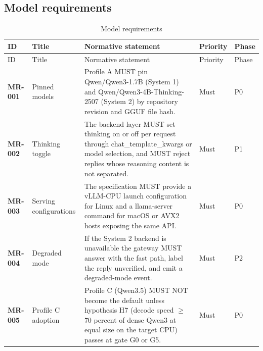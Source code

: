 \subsection{Model requirements}
\begin{longtable}{@{}p{1.45cm}p{2.5cm}p{8.1cm}p{1.6cm}p{1.1cm}@{}}
\caption{Model requirements}\\
\toprule ID & Title & Normative statement & Priority & Phase\\\midrule\endfirsthead
\toprule ID & Title & Normative statement & Priority & Phase\\\midrule\endhead
\bottomrule\endfoot
\textbf{MR-001} & Pinned models & Profile A MUST pin Qwen/Qwen3-1.7B (System 1) and Qwen/Qwen3-4B-Thinking-2507 (System 2) by repository revision and GGUF file hash. & Must & P0\\
\textbf{MR-002} & Thinking toggle & The backend layer MUST set thinking on or off per request through chat\_template\_kwargs or model selection, and MUST reject replies whose reasoning content is not separated. & Must & P1\\
\textbf{MR-003} & Serving configurations & The specification MUST provide a vLLM-CPU launch configuration for Linux and a llama-server command for macOS or AVX2 hosts exposing the same API. & Must & P0\\
\textbf{MR-004} & Degraded mode & If the System 2 backend is unavailable the gateway MUST answer with the fast path, label the reply unverified, and emit a degraded-mode event. & Must & P2\\
\textbf{MR-005} & Profile C adoption & Profile C (Qwen3.5) MUST NOT become the default unless hypothesis H7 (decode speed $\ge$ 70 percent of dense Qwen3 at equal size on the target CPU) passes at gate G0 or G5. & Must & P0\\
\end{longtable}

